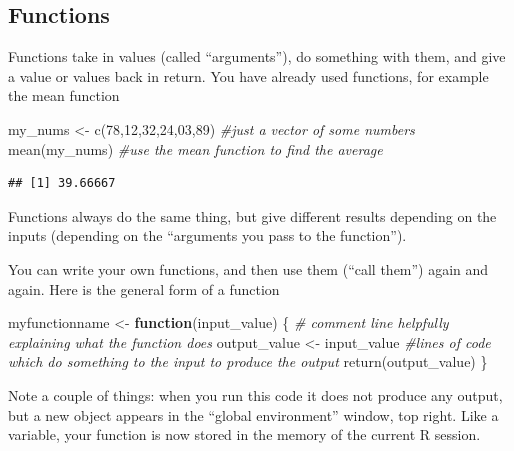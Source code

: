 \documentclass[
]{book}
\newenvironment{Shaded}{\begin{snugshade}}{\end{snugshade}}
\newcommand{\CommentTok}[1]{\textcolor[rgb]{0.56,0.35,0.01}{\textit{#1}}}
\newcommand{\ControlFlowTok}[1]{\textcolor[rgb]{0.13,0.29,0.53}{\textbf{#1}}}
\newcommand{\DecValTok}[1]{\textcolor[rgb]{0.00,0.00,0.81}{#1}}
\newcommand{\FunctionTok}[1]{\textcolor[rgb]{0.00,0.00,0.00}{#1}}
\newcommand{\NormalTok}[1]{#1}
\newcommand{\OtherTok}[1]{\textcolor[rgb]{0.56,0.35,0.01}{#1}}
\begin{document}
\hypertarget{functions}{%
\subsection{Functions}\label{functions}}

Functions take in values (called ``arguments''), do something with them, and give a value or values back in return. You have already used functions, for example the mean function

\begin{Shaded}
\begin{Highlighting}[]
\NormalTok{my\_nums }\OtherTok{\textless{}{-}} \FunctionTok{c}\NormalTok{(}\DecValTok{78}\NormalTok{,}\DecValTok{12}\NormalTok{,}\DecValTok{32}\NormalTok{,}\DecValTok{24}\NormalTok{,}\DecValTok{03}\NormalTok{,}\DecValTok{89}\NormalTok{) }\CommentTok{\#just a vector of some numbers}
\FunctionTok{mean}\NormalTok{(my\_nums) }\CommentTok{\#use the mean function to find the average}
\end{Highlighting}
\end{Shaded}

\begin{verbatim}
## [1] 39.66667
\end{verbatim}

Functions always do the same thing, but give different results depending on the inputs (depending on the ``arguments you pass to the function'').

You can write your own functions, and then use them (``call them'') again and again. Here is the general form of a function

\begin{Shaded}
\begin{Highlighting}[]
\NormalTok{myfunctionname }\OtherTok{\textless{}{-}} \ControlFlowTok{function}\NormalTok{(input\_value) \{}
\CommentTok{\# comment line helpfully explaining what the function does}
\NormalTok{output\_value }\OtherTok{\textless{}{-}}\NormalTok{ input\_value }\CommentTok{\#lines of code which do something to the input to produce the output}
\FunctionTok{return}\NormalTok{(output\_value)}
\NormalTok{\}}
\end{Highlighting}
\end{Shaded}

Note a couple of things: when you run this code it does not produce any output, but a new object appears in the ``global environment'' window, top right. Like a variable, your function is now stored in the memory of the current R session.
\end{document}
